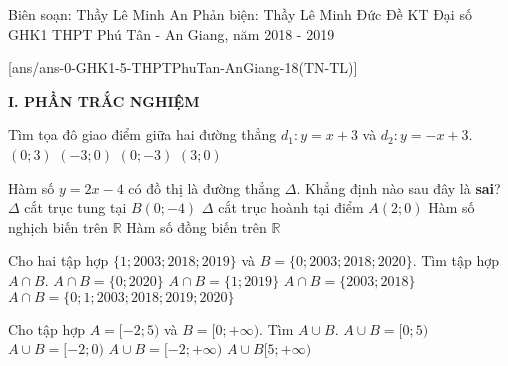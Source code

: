 \begin{name}
{Biên soạn: Thầy Lê Minh An\newline
Phản biện: Thầy Lê Minh Đức}
{Đề KT Đại số GHK1 THPT Phú Tân - An Giang, năm 2018 - 2019}
\end{name}

\setcounter{ex}{0}\setcounter{bt}{0}
[ans/ans-0-GHK1-5-THPTPhuTan-AnGiang-18(TN-TL)]

\noindent\textbf{I. PHẦN TRẮC NGHIỆM}

\begin{ex}%
Tìm tọa đô giao điểm giữa hai đường thẳng $d_1\colon y=x+3$ và $d_2\colon y=-x+3$.
	\choice
	{\True $(0;3)$}
	{$(-3;0)$}
	{$(0;-3)$}
	{$(3;0)$}
\end{ex}

\begin{ex}%
	Hàm số $y=2x-4$ có đồ thị là đường thẳng $\Delta$. Khẳng định nào sau đây là \textbf{sai}?
	\choice
	{$\Delta$ cắt trục tung tại $B(0;-4)$}
	{$\Delta$ cắt trục hoành tại điểm $A(2;0)$}
	{\True Hàm số nghịch biến trên $\mathbb{R}$}
	{Hàm số đồng biến trên $\mathbb{R}$}
\end{ex}

\begin{ex}%
	Cho hai tập hợp $\{1;2003;2018;2019\}$ và $B=\{0;2003;2018;2020\}$. Tìm tập hợp $A\cap B$.
	\choice
	{$A\cap B=\{0;2020\}$}
	{$A\cap B=\{1;2019\}$}
	{\True $A\cap B=\{2003;2018\}$}
	{$A\cap B=\{0;1;2003;2018;2019;2020\}$}
\end{ex}

\begin{ex}%
	Cho tập hợp $A=[-2;5)$ và $B=[0;+\infty)$. Tìm $A\cup B$.
	\choice
	{$A\cup B=[0;5)$}
	{$A\cup B=[-2;0)$}
	{\True $A\cup B=[-2;+\infty)$}
	{$A\cup B[5;+\infty)$}
	\loigiai{
		$A\cup B=[-2;+\infty)$.
	}
\end{ex}

